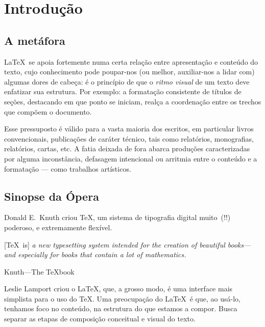 \section{Introdução}



\subsection{A metáfora}

\LaTeX\ se apoia fortemente numa certa relação entre apresentação e
conteúdo do texto, cujo
conhecimento pode poupar-nos (ou melhor, auxiliar-nos a lidar com)
algumas dores de cabeça: é o princípio de que o \emph{ritmo visual} de
um texto deve enfatizar sua estrutura. Por exemplo: a formatação
consistente de títulos de seções, destacando em que ponto se iniciam,
realça a coordenação entre os trechos que compõem o documento.

Esse pressuposto é válido para a vasta maioria dos escritos, em
particular livros convencionais, publicações de caráter técnico,
tais como relatórios, monografias,  relatórios, cartas, etc. A fatia
deixada de fora abarca produções caracterizadas por alguma
inconstância, defasagem intencional ou arritmia entre o conteúdo e a
formatação --- como trabalhos artísticos.

\subsection{Sinopse da Ópera}

Donald E.~Knuth criou \TeX, um sistema de tipografia digital muito~(!!)
poderoso, e extremamente flexível.

\begin{center}
\begin{minipage}{.75\textwidth}
  [\TeX\ is] \textit{a new typesetting system intended for the creation of
  beautiful books---and especially for books that contain a lot of
  mathematics.}

  \hfill Knuth---The \TeX book~\cite{texbook}
\end{minipage}
\end{center}

  
Leslie Lamport criou o \LaTeX, que, a grosso modo, é uma interface
mais simplista para o uso do \TeX. Uma preocupação do \LaTeX\ é que,
ao usá-lo, tenhamos foco no conteúdo, na estrutura do que estamos a
compor. Busca separar as etapas de composição conceitual e visual do
texto.

